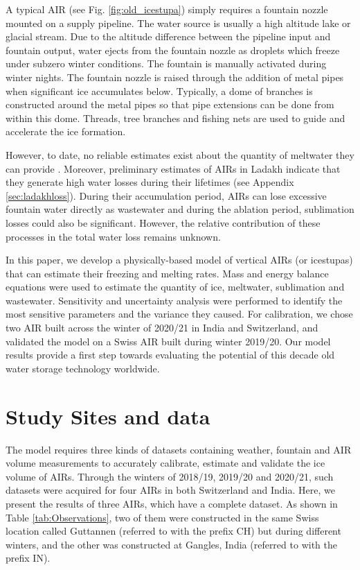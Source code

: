 \documentclass[utf8]{frontiersSCNS}
\begin{document}
A typical AIR (see Fig. \ref{fig:old_icestupa}) simply requires a fountain nozzle mounted on a supply pipeline.
The water source is usually a high altitude lake or glacial stream. Due to the altitude difference between the
pipeline input and fountain output, water ejects from the fountain nozzle as droplets which freeze under subzero
winter conditions. The fountain is manually activated during winter nights. The fountain nozzle is raised
through the addition of metal pipes when significant ice accumulates below.  Typically, a dome of branches is
constructed around the metal pipes so that pipe extensions can be done from within this dome. Threads, tree
branches and fishing nets are used to guide and accelerate the ice formation.

However, to date, no reliable estimates exist about the quantity of meltwater they can provide
\citep{Nusser_2018} . Moreover, preliminary estimates of AIRs in Ladakh indicate that they generate high water
losses during their lifetimes (see Appendix \ref{sec:ladakhloss}). During their accumulation period, AIRs can
lose excessive fountain water directly as wastewater and during the ablation period, sublimation losses could
also be significant.  However, the relative contribution of these processes in the total water loss remains
unknown.

In this paper, we develop a physically-based model of vertical AIRs (or icestupas) that can estimate their
freezing and melting rates. Mass and energy balance equations were used to estimate the quantity of ice,
meltwater, sublimation and wastewater. Sensitivity and uncertainty analysis were performed to identify the most
sensitive parameters and the variance they caused. For calibration, we chose two AIR built across the winter
of 2020/21 in India and Switzerland, and validated the model on a Swiss AIR built during winter 2019/20. Our
model results provide a first step towards evaluating the potential of this decade old water storage technology
worldwide.

\section{Study Sites and data}

The model requires three kinds of datasets containing weather, fountain and AIR volume measurements to
accurately calibrate, estimate and validate the ice volume of AIRs. Through the winters of 2018/19, 2019/20 and
2020/21, such datasets were acquired for four AIRs in both Switzerland and India. Here, we present the results of
three AIRs, which have a complete dataset. As shown in Table \ref{tab:Observations}, two of them were
constructed in the same Swiss location called Guttannen (referred to with the prefix CH) but during different
winters, and the other was constructed at Gangles, India (referred to with the prefix IN).
\end{document}
